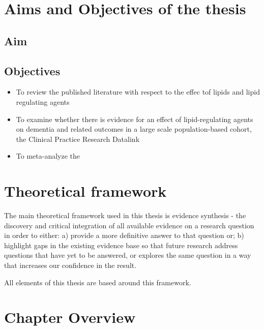 \documentclass[a4paper, twoside]{templates/ociamthesis}
\providecommand{\tightlist}{%
  \setlength{\itemsep}{0pt}\setlength{\parskip}{0pt}}
\begin{document}
\hypertarget{aims-and-objectives-of-the-thesis}{%
\section{Aims and Objectives of the thesis}\label{aims-and-objectives-of-the-thesis}}

\hypertarget{aim}{%
\subsection{Aim}\label{aim}}

\hypertarget{objectives}{%
\subsection{Objectives}\label{objectives}}

\begin{itemize}
\tightlist
\item
  To review the published literature with respect to the effec tof lipids and lipid regulating agents\\
\item
  To examine whether there is evidence for an effect of lipid-regulating agents on dementia and related outcomes in a large scale population-based cohort, the Clinical Practice Research Datalink
\item
  To meta-analyze the
\end{itemize}

\hypertarget{theoretical-framework}{%
\section{Theoretical framework}\label{theoretical-framework}}

The main theoretical framework used in this thesis is evidence synthesis - the discovery and critical integration of all available evidence on a research question in order to either: a) provide a more definitive answer to that question or; b) highlight gaps in the existing evidence base so that future research address questions that have yet to be answered, or explores the same question in a way that increases our confidence in the result.

All elements of this thesis are based around this framework.

\hypertarget{chapter-overview}{%
\section{Chapter Overview}\label{chapter-overview}}
\end{document}

